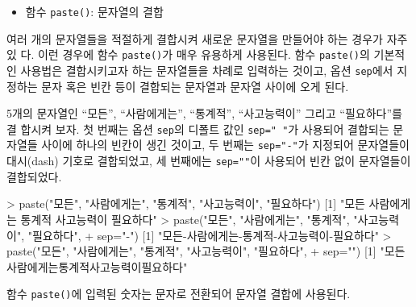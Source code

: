 \documentclass[
]{book}
\newenvironment{Shaded}{\begin{snugshade}}{\end{snugshade}}
\newcommand{\AttributeTok}[1]{\textcolor[rgb]{0.77,0.63,0.00}{#1}}
\newcommand{\DecValTok}[1]{\textcolor[rgb]{0.00,0.00,0.81}{#1}}
\newcommand{\FunctionTok}[1]{\textcolor[rgb]{0.00,0.00,0.00}{#1}}
\newcommand{\NormalTok}[1]{#1}
\newcommand{\SpecialCharTok}[1]{\textcolor[rgb]{0.00,0.00,0.00}{#1}}
\newcommand{\StringTok}[1]{\textcolor[rgb]{0.31,0.60,0.02}{#1}}
\providecommand{\tightlist}{%
  \setlength{\itemsep}{0pt}\setlength{\parskip}{0pt}}
\begin{document}
\begin{itemize}
\tightlist
\item
  함수 \texttt{paste()}: 문자열의 결합
\end{itemize}

여러 개의 문자열들을 적절하게 결합시켜 새로운 문자열을 만들어야 하는 경우가 자주 있
다. 이런 경우에 함수 \texttt{paste()}가 매우 유용하게 사용된다. 함수 \texttt{paste()}의 기본적인 사용법은 결합시키고자 하는 문자열들을 차례로 입력하는 것이고, 옵션 \texttt{sep}에서 지정하는 문자 혹은 빈칸 등이 결합되는 문자열과 문자열 사이에 오게 된다.

5개의 문자열인 ``모든'', ``사람에게는'', ``통계적'', ``사고능력이'' 그리고 ``필요하다''를 결
합시켜 보자. 첫 번째는 옵션 \texttt{sep}의 디폴트 값인 \texttt{sep="\ "}가 사용되어 결합되는 문자열들
사이에 하나의 빈칸이 생긴 것이고, 두 번째는 \texttt{sep="-"}가 지정되어 문자열들이 대시(dash)
기호로 결합되었고, 세 번째에는 \texttt{sep=""}이 사용되어 빈칸 없이 문자열들이 결합되었다.

\begin{Shaded}
\begin{Highlighting}[]
\SpecialCharTok{\textgreater{}} \FunctionTok{paste}\NormalTok{(}\StringTok{"모든"}\NormalTok{, }\StringTok{"사람에게는"}\NormalTok{, }\StringTok{"통계적"}\NormalTok{, }\StringTok{"사고능력이"}\NormalTok{, }\StringTok{"필요하다"}\NormalTok{)}
\NormalTok{[}\DecValTok{1}\NormalTok{] }\StringTok{"모든 사람에게는 통계적 사고능력이 필요하다"}
\SpecialCharTok{\textgreater{}} \FunctionTok{paste}\NormalTok{(}\StringTok{"모든"}\NormalTok{, }\StringTok{"사람에게는"}\NormalTok{, }\StringTok{"통계적"}\NormalTok{, }\StringTok{"사고능력이"}\NormalTok{, }\StringTok{"필요하다"}\NormalTok{,}
\SpecialCharTok{+}       \AttributeTok{sep=}\StringTok{"{-}"}\NormalTok{)}
\NormalTok{[}\DecValTok{1}\NormalTok{] }\StringTok{"모든{-}사람에게는{-}통계적{-}사고능력이{-}필요하다"}
\SpecialCharTok{\textgreater{}} \FunctionTok{paste}\NormalTok{(}\StringTok{"모든"}\NormalTok{, }\StringTok{"사람에게는"}\NormalTok{, }\StringTok{"통계적"}\NormalTok{, }\StringTok{"사고능력이"}\NormalTok{, }\StringTok{"필요하다"}\NormalTok{,}
\SpecialCharTok{+}       \AttributeTok{sep=}\StringTok{""}\NormalTok{)}
\NormalTok{[}\DecValTok{1}\NormalTok{] }\StringTok{"모든사람에게는통계적사고능력이필요하다"}
\end{Highlighting}
\end{Shaded}

함수 \texttt{paste()}에 입력된 숫자는 문자로 전환되어 문자열 결합에 사용된다.
\end{document}
